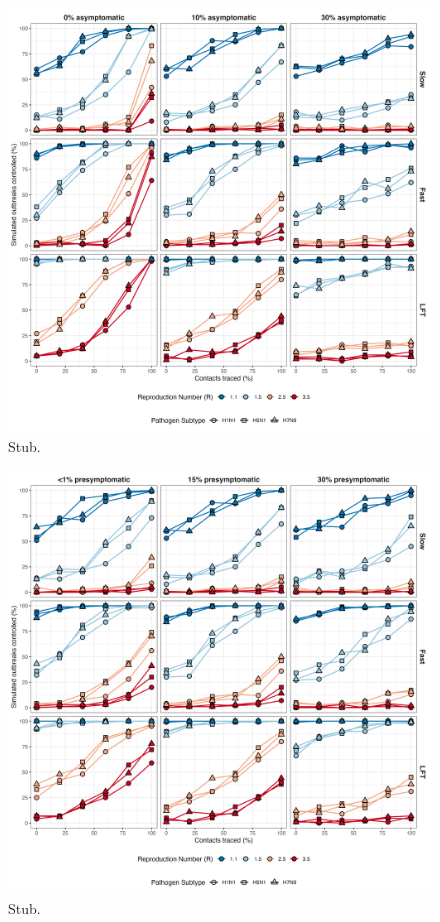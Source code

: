 \documentclass{article}
\begin{document}
\begin{figure}[ht]
\centering
\includegraphics[width=\textwidth]{../plots/prop_outbreak_control_prop_asym_iso.png}
\caption{Stub.}
\label{fig:prop-outbreak-control-prop-asym-iso}
\end{figure}

\begin{figure}[ht]
\centering
\includegraphics[width=\textwidth]{../plots/prop_outbreak_control_prop_presym_iso.png}
\caption{Stub.}
\label{fig:prop-outbreak-control-prop-presym-iso}
\end{figure}
\end{document}
